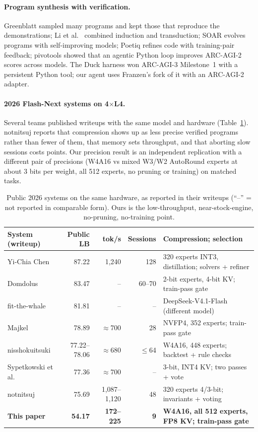 \documentclass[11pt]{article}
\begin{document}
\paragraph{Program synthesis with verification.} Greenblatt \cite{greenblatt2024} sampled many programs and kept those that reproduce the demonstrations; Li et al.\ \cite{li2024} combined induction and transduction; SOAR \cite{soar2025} evolves programs with self-improving models; Poetiq \cite{poetiq} refines code with training-pair feedback; pivotools \cite{pivotools2026} showed that an agentic Python loop improves ARC-AGI-2 scores across models. The Duck harness \cite{duck} won ARC-AGI-3 Milestone~1 with a persistent Python tool; our agent uses Franzen's fork of it \cite{duckfork} with an ARC-AGI-2 adapter.
\paragraph{2026 Flash-Next systems on 4$\times$L4.} Several teams published writeups with the same model and hardware (Table~\ref{tab:public}). notnitsuj \cite{notnitsuj2026} reports that compression shows up as less precise verified programs rather than fewer of them, that memory sets throughput, and that aborting slow sessions costs points. Our precision result is an independent replication with a different pair of precisions (W4A16 vs mixed W3/W2 AutoRound experts at about 3 bits per weight, all 512 experts, no pruning or training) on matched tasks.

\begin{table}[tbp]
\centering\small
\begin{tabularx}{\linewidth}{@{}lrrrX@{}}
\toprule
System (writeup) & Public LB & tok/s & Sessions & Compression; selection \\
\midrule
Yi-Chia Chen \cite{yichia2026} & 87.22 & 1{,}240 & 128 & 320 experts INT3, distillation; solvers + refiner \\
Domdolus \cite{domdolus2026} & 83.47 & -- & 60--70 & 2-bit experts, 4-bit KV; train-pass gate \\
fit-the-whale \cite{whale2026} & 81.81 & -- & -- & DeepSeek-V4.1-Flash (different model) \\
Majkel \cite{majkel2026} & 78.89 & $\approx$700 & 28 & NVFP4, 352 experts; train-pass gate \\
nisshokuitsuki \cite{ni2026} & 77.22--78.06 & $\approx$680 & $\le$64 & W4A16, 448 experts; backtest + rule checks \\
Sypetkowski et al.\ \cite{maciej2026} & 77.36 & $\approx$700 & -- & 3-bit, INT4 KV; two passes + vote \\
notnitsuj \cite{notnitsuj2026} & 75.69 & 1{,}087--1{,}120 & 48 & 320 experts 4/3-bit; invariants + voting \\
\textbf{This paper} & \textbf{54.17} & \textbf{172--225} & \textbf{9} & \textbf{W4A16, all 512 experts, FP8 KV; train-pass gate} \\
\bottomrule
\end{tabularx}
\caption{Public 2026 systems on the same hardware, as reported in their writeups (``--'' = not reported in comparable form). Ours is the low-throughput, near-stock-engine, no-pruning, no-training point.}
\label{tab:public}
\end{table}
\end{document}
